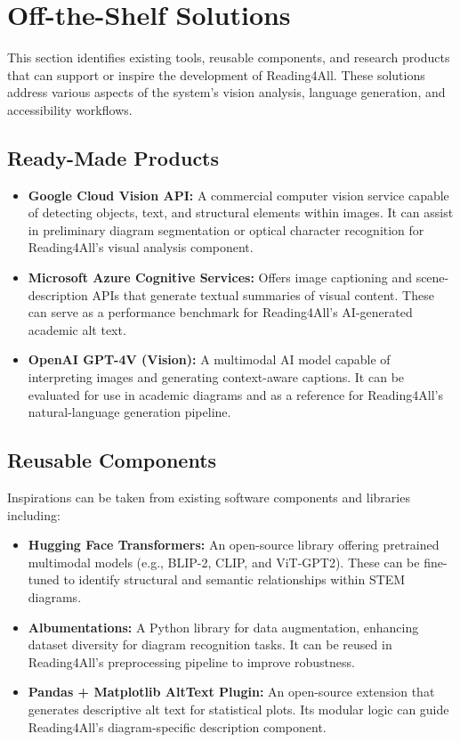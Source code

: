 \documentclass[12pt]{article}
\begin{document}
\section{Off-the-Shelf Solutions}

This section identifies existing tools, reusable components, and
research products that can support or inspire the development of
Reading4All. These solutions address various aspects of the system’s
vision analysis, language generation, and accessibility workflows.

\subsection{Ready-Made Products}

\begin{itemize}
  \item \textbf{Google Cloud Vision API:} A commercial computer
    vision service capable of detecting objects, text, and structural
    elements within images. It can assist in preliminary diagram
    segmentation or optical character recognition for Reading4All’s
    visual analysis component.

  \item \textbf{Microsoft Azure Cognitive Services:} Offers image
    captioning and scene-description APIs that generate textual
    summaries of visual content. These can serve as a performance
    benchmark for Reading4All’s AI-generated academic alt text.

  \item \textbf{OpenAI GPT-4V (Vision):} A multimodal AI model
    capable of interpreting images and generating context-aware
    captions. It can be evaluated for use in academic diagrams and as
    a reference for Reading4All’s natural-language generation pipeline.
\end{itemize}

\subsection{Reusable Components}
Inspirations can be taken from existing software components and libraries including: 
\begin{itemize}
  \item \textbf{Hugging Face Transformers:} An open-source library
    offering pretrained multimodal models (e.g., BLIP-2, CLIP, and
    ViT-GPT2). These can be fine-tuned to identify structural and
    semantic relationships within STEM diagrams.

  \item \textbf{Albumentations:} A Python library for data
    augmentation, enhancing dataset diversity for diagram recognition
    tasks. It can be reused in Reading4All’s preprocessing pipeline
    to improve robustness.

  \item \textbf{Pandas + Matplotlib AltText Plugin:} An open-source
    extension that generates descriptive alt text for statistical
    plots. Its modular logic can guide Reading4All’s diagram-specific
    description component.
\end{itemize}
\end{document}
